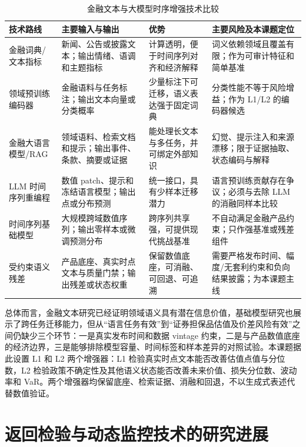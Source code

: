 \begin{table}[htbp]
  \centering
  \caption{金融文本与大模型时序增强技术比较}
  \label{tab:review-llm-methods}
  \ReportTableText
  \begin{tabularx}{\textwidth}{@{}p{7.5em}p{10.5em}p{10.5em}X@{}}
    \toprule
    技术路线 & 主要输入与输出 & 优势 & 主要风险及本课题定位 \\
    \midrule
    金融词典/文本指标 & 新闻、公告或披露文本；输出情绪、语调和主题指标 & 计算透明，便于时间序列对齐和经济解释 & 词义依赖领域且覆盖有限；作为可审计特征和简单基准 \\
    领域预训练编码器 & 金融语料与任务标注；输出文本向量或分类概率 & 少量标注下可迁移，语义表达强于固定词典 & 分类性能不等于风险增益；作为 L1/L2 的编码器候选 \\
    金融大语言模型/RAG & 领域语料、检索文档和提示；输出事件、条款、摘要或证据 & 能处理长文本与多任务，并可绑定外部知识 & 幻觉、提示注入和来源漂移；限于证据抽取、状态编码与解释 \\
    LLM 时间序列重编程 & 数值 patch、提示和冻结语言模型；输出点或分布预测 & 统一接口，具有少样本迁移潜力 & 语言预训练贡献存在争议；必须与去除 LLM 的消融同样本比较 \\
    时间序列基础模型 & 大规模跨域数值序列；输出零样本或微调预测分布 & 跨序列共享强，可提供现代挑战基准 & 不自动满足金融产品约束；只作强基准或残差组件 \\
    受约束语义残差 & 产品底座、真实时点文本与质量门禁；输出残差或状态权重 & 保留数值底座，可消融、可回退、可追溯 & 需要严格发布时间、幅度/无套利约束和负向结果披露；为本课题主线 \\
    \bottomrule
  \end{tabularx}
\end{table}

总体而言，金融文本研究已经证明领域语义具有潜在信息价值，基础模型研究也展示了跨任务迁移能力，但从“语言任务有效”到“证券担保品估值及价差风险有效”之间仍缺少三个环节：一是真实发布时间和数据 vintage 约束，二是与产品数值底座的经济边界，三是能够排除模型容量、时间标签和样本差异的对照试验。本课题据此设置 L1 和 L2 两个增强器：L1 检验真实时点文本能否改善估值点值与分位数，L2 检验政策不确定性及其他语义状态能否改善未来价值、损失分位数、波动率和 VaR。两个增强器均保留底座、检索证据、消融和回退，不以生成式表述代替数值验证。

\section{返回检验与动态监控技术的研究进展}

